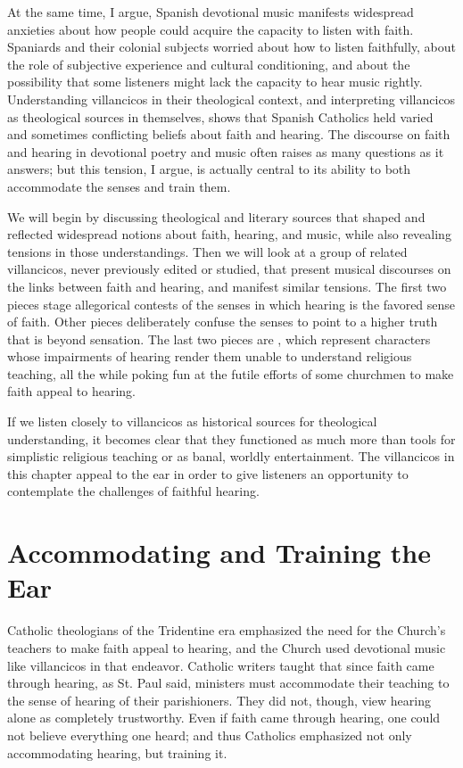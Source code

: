 At the same time, I argue, Spanish devotional music manifests widespread
anxieties about how people could acquire the capacity to listen with faith.
Spaniards and their colonial subjects worried about how to listen faithfully,
about the role of subjective experience and cultural conditioning, and about the
possibility that some listeners might lack the capacity to hear music rightly.
Understanding villancicos in their theological context, and interpreting
villancicos as theological sources in themselves, shows that Spanish Catholics
held varied and sometimes conflicting beliefs about faith and hearing.  The
discourse on faith and hearing in devotional poetry and music often raises as
many questions as it answers; but this tension, I argue, is actually central to
its ability to both accommodate the senses and train them.

We will begin by discussing theological and literary sources that shaped and
reflected widespread notions about faith, hearing, and music, while also
revealing tensions in those understandings.  
Then we will look at a group of related villancicos, never previously edited or
studied, that present musical discourses on the links between faith and hearing,
and manifest similar tensions.
The first two pieces stage allegorical contests of the senses in which hearing
is the favored sense of faith.  
Other pieces deliberately confuse the senses to point to a higher truth that is
beyond sensation.
The last two pieces are , which represent
characters whose impairments of hearing render them unable to understand
religious teaching, all the while poking fun at the futile efforts of some
churchmen to make faith appeal to hearing.

If we listen closely to villancicos as historical sources for theological
understanding, it becomes clear that they functioned as much more than tools for
simplistic religious teaching or as banal, worldly entertainment.  
The villancicos in this chapter appeal to the ear in order to give listeners an
opportunity to contemplate the challenges of faithful hearing.

\section{Accommodating and Training the Ear}

Catholic theologians of the Tridentine era emphasized the need for the Church's
teachers to make faith appeal to hearing, and the Church used devotional music
like villancicos in that endeavor.  
Catholic writers taught that since faith came through hearing, as St. Paul said,
ministers must accommodate their teaching to the sense of hearing of their
parishioners.
They did not, though, view hearing alone as completely trustworthy.  
Even if faith came through hearing, one could not believe everything one heard;
and thus Catholics emphasized not only accommodating hearing, but training it.

